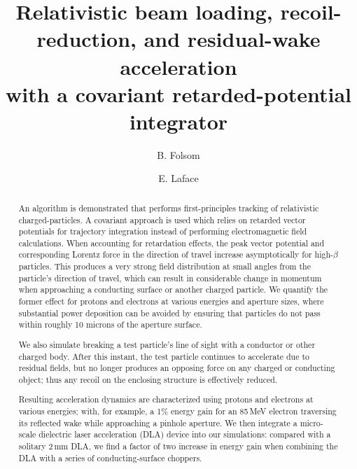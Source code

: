 \documentclass[reprint,
               amsmath,amssymb,nofootinbib, aps%
              ]{revtex4-2}
\begin{document}
\title{
Relativistic beam loading, recoil-reduction, and residual-wake acceleration \\ with a covariant retarded-potential integrator}

\author{B. Folsom}
\author{E. Laface}%
%



\begin{abstract}
An algorithm is demonstrated that performs first-principles tracking of relativistic charged-particles. A covariant approach is used which relies on retarded vector potentials for trajectory integration instead of performing electromagnetic field calculations. When accounting for retardation effects, the peak vector potential and corresponding Lorentz force in the direction of travel increase asymptotically for high-$\beta$ particles. This produces a very strong field distribution at small angles from the particle's direction of travel, which can result in considerable change in momentum when approaching a conducting surface or another charged particle. We quantify the former effect for protons and electrons at various energies and aperture sizes, where substantial power deposition can be avoided by ensuring that particles do not pass within roughly 10 microns of the aperture surface.

We also simulate breaking a test particle's line of sight with a conductor or other charged body. After this instant, the test particle continues to accelerate due to residual fields, but no longer produces an opposing force on any charged or conducting object; thus any recoil on the enclosing structure is effectively reduced.

Resulting acceleration dynamics are characterized using protons and electrons at various energies; with, for example, a 1\% energy gain for an 85\,MeV electron traversing its reflected wake while approaching a pinhole aperture. We then integrate a micro-scale dielectric laser acceleration (DLA) device into our simulations: compared with a solitary 2\,mm DLA, we find a factor of two increase in energy gain when combining the DLA with a series of conducting-surface choppers.



\end{abstract}
\end{document}
